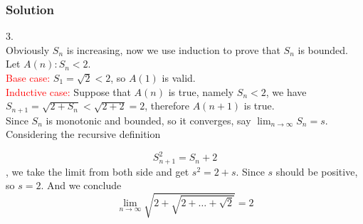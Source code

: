 \documentclass{beamer}
\begin{document}
        \begin{frame}
            \frametitle{Solution}
            3.\\
            \hspace{1em}Obviously $S_n$ is increasing, now we use
            induction to prove that $S_n$ is bounded. Let $A(n) :S_n < 2$.\\
            \hspace{1em}\textcolor{red}{Base case:} $S_1=\sqrt{2}<2$, so $A(1)$ is valid.\\
            \hspace{1em}\textcolor{red}{Inductive case:} Suppose that $A(n)$ is true, namely $S_n < 2$, we have $S_{n+1}=\sqrt{2+S_n}<\sqrt{2+2}=2$, 
            therefore $A(n+1)$ is true.\\
            \vspace{0.5em}
            Since $S_n$ is monotonic and bounded, so it converges, say $\lim_{n\to \infty} S_n = s$. Considering the recursive definition
            
            $$S_{n+1}^2=S_n+2$$,
            we take the limit from both side and get $s^2=2+s$. Since $s$ should be positive, so $s=2$. And we conclude
            $$\underset{n\to \infty}{\lim}\sqrt{2+\sqrt{2+\dots+\sqrt{2}}}=2$$
        \end{frame}
\end{document}
